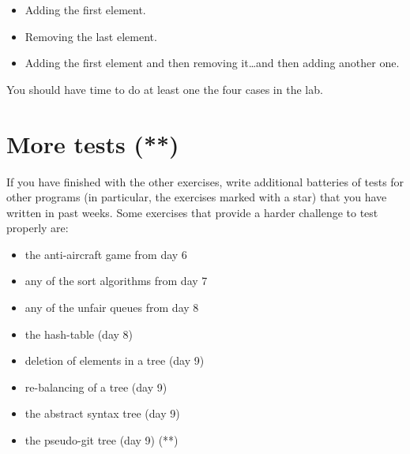 \documentclass{article}
\begin{document}
\begin{itemize}
\item Adding the first element.
\item Removing the last element.
\item Adding the first element and then removing it\ldots and then
  adding another one.
\end{itemize}

You should have time to do at least one the four cases in the lab.

\section{More tests (**)}
\label{sec:more-tests-}

If you have finished with the other exercises, write additional
batteries of tests for other programs (in particular, the exercises
marked with a star)  that you have written in past
weeks. Some exercises that provide a harder challenge to test properly
are: 

\begin{itemize}
\item the anti-aircraft game from day 6
\item any of the sort algorithms from day 7
\item any of the unfair queues from day 8
\item the hash-table (day 8)
\item deletion of elements in a tree (day 9)
\item re-balancing of a tree (day 9)
\item the abstract syntax tree (day 9)
\item the pseudo-git tree (day 9) (**)
\end{itemize}
\end{document}
